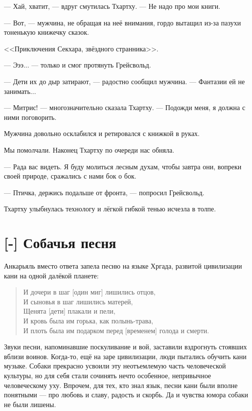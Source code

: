 --- Хай, хватит, --- вдруг смутилась Тхартху.
--- Не надо про мои книги.

--- Вот, --- мужчина, не обращая на неё внимания, гордо вытащил из-за пазухи тоненькую книжечку сказок.

<<Приключения Секхара, звёздного странника>>.

--- Эээ... --- только и смог протянуть Грейсвольд.

--- Дети их до дыр затирают, --- радостно сообщил мужчина.
--- Фантазии ей не занимать...

--- Митрис! --- многозначительно сказала Тхартху.
--- Подожди меня, я должна с ними поговорить.

Мужчина довольно осклабился и ретировался с книжкой в руках.

Мы помолчали.
Наконец Тхартху по очереди нас обняла.

--- Рада вас видеть.
Я буду молиться лесным духам, чтобы завтра они, вопреки своей природе, сражались с нами бок о бок.

--- Птичка, держись подальше от фронта, --- попросил Грейсвольд.

Тхартху улыбнулась технологу и лёгкой гибкой тенью исчезла в толпе.

\section{[-] Собачья песня}

\textspace

Анкарьяль вместо ответа запела песню на языке Хргада, развитой цивилизации кани на одной далёкой планете:

\begin{verse}
И дочери в шаг [один миг] лишились отцов,\\
И сыновья в шаг лишились матерей,\\
Щенята [дети] плакали и пели,\\
И кровь была им горька, как полынь-трава,\\
И плоть была им подарком перед [временем] голода и смерти\FM.\\
\end{verse}

Звуки песни, напоминавшие поскуливание и вой, заставили вздрогнуть стоявших вблизи воинов.
Когда-то, ещё на заре цивилизации, люди пытались обучить кани музыке.
Собаки прекрасно усвоили эту неотъемлемую часть человеческой культуры, но для себя стали сочинять нечто особенное, непривычное человеческому уху.
Впрочем, для тех, кто знал язык, песни кани были вполне понятными --- про любовь и славу, радость и скорбь.
Да и чувства юмора собаки не были лишены.

